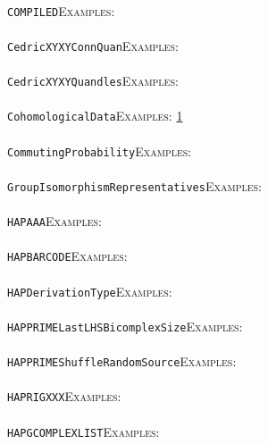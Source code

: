\documentclass[a4paper,11pt]{report}
\begin{document}
{{ \\
 \texttt{COMPILED}{\nobreakspace}{\nobreakspace}{\nobreakspace}{\nobreakspace}\textsc{Examples:} \\
 \\
 \texttt{Cedric{\textunderscore}XYXYConnQuan}{\nobreakspace}{\nobreakspace}{\nobreakspace}{\nobreakspace}\textsc{Examples:} \\
 \\
 \texttt{Cedric{\textunderscore}XYXYQuandles}{\nobreakspace}{\nobreakspace}{\nobreakspace}{\nobreakspace}\textsc{Examples:} \\
 \\
 \texttt{CohomologicalData}{\nobreakspace}{\nobreakspace}{\nobreakspace}{\nobreakspace}\textsc{Examples:} \href{tutorial/chap7.html} {1}{\nobreakspace} \\
 \\
 \texttt{CommutingProbability}{\nobreakspace}{\nobreakspace}{\nobreakspace}{\nobreakspace}\textsc{Examples:} \\
 \\
 \texttt{GroupIsomorphismRepresentatives}{\nobreakspace}{\nobreakspace}{\nobreakspace}{\nobreakspace}\textsc{Examples:} \\
 \\
 \texttt{HAPAAA}{\nobreakspace}{\nobreakspace}{\nobreakspace}{\nobreakspace}\textsc{Examples:} \\
 \\
 \texttt{HAPBARCODE}{\nobreakspace}{\nobreakspace}{\nobreakspace}{\nobreakspace}\textsc{Examples:} \\
 \\
 \texttt{HAPDerivationType}{\nobreakspace}{\nobreakspace}{\nobreakspace}{\nobreakspace}\textsc{Examples:} \\
 \\
 \texttt{HAPPRIME{\textunderscore}LastLHSBicomplexSize}{\nobreakspace}{\nobreakspace}{\nobreakspace}{\nobreakspace}\textsc{Examples:} \\
 \\
 \texttt{HAPPRIME{\textunderscore}ShuffleRandomSource}{\nobreakspace}{\nobreakspace}{\nobreakspace}{\nobreakspace}\textsc{Examples:} \\
 \\
 \texttt{HAPRIGXXX}{\nobreakspace}{\nobreakspace}{\nobreakspace}{\nobreakspace}\textsc{Examples:} \\
 \\
 \texttt{HAP{\textunderscore}GCOMPLEX{\textunderscore}LIST}{\nobreakspace}{\nobreakspace}{\nobreakspace}{\nobreakspace}\textsc{Examples:} \\
}}
\end{document}
